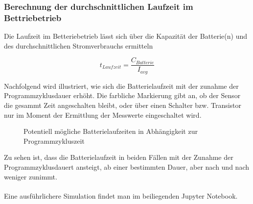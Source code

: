 \subsubsection{Berechnung der durchschnittlichen Laufzeit im Bettriebetrieb}

Die Laufzeit im Betteriebetrieb lässt sich über die Kapazität der Batterie(n) und des durchschnittlichen Stromverbrauchs ermitteln

\[t_{Laufzeit} = \frac{C_{Batterie}}{I_{avg}}\]

Nachfolgend wird illustriert, wie sich die Batterielaufzeit mit der zunahme der Programmzyklusdauer erhöht. Die farbliche Markierung gibt an, ob der Sensor die gesammt Zeit angeschalten bleibt, oder über einen Schalter bzw. Transistor nur im Moment der Ermittlung der Messwerte eingeschaltet wird.

\begin{center}
	\begin{figure}[h]
	 
	 \noindent{}
	 \caption[Potentiell mögliche Batterielaufzeiten in Abhängigkeit zur Programmzykluszeit]{Potentiell mögliche Batterielaufzeiten in Abhängigkeit zur Programmzykluszeit}
	 \label{fig:batterielaufzeit}
	\end{figure}
\end{center}

Zu sehen ist, dass die Batterielaufzeit in beiden Fällen mit der Zunahme der Programmzyklusdauert ansteigt, ab einer bestimmten Dauer, aber nach und nach weniger zunimmt.\\\\
Eine ausführlichere Simulation findet man im beiliegenden Jupyter Notebook.\cite{schimmel}

\newpage
